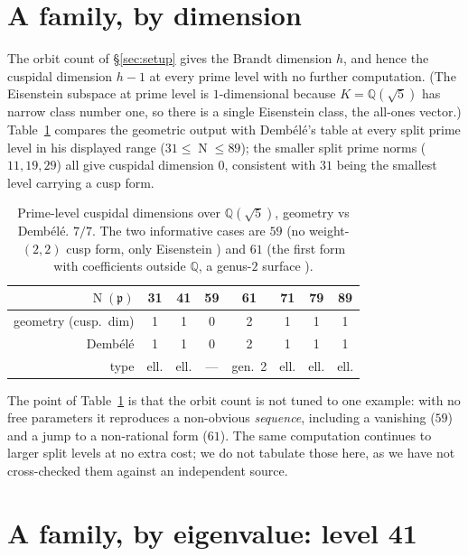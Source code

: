 \documentclass[11pt,a4paper]{article}
\newcommand{\Q}{\mathbb{Q}}
\newcommand{\fp}{\mathfrak{p}}
\DeclareMathOperator{\Nm}{N}
\begin{document}
\section{A family, by dimension}\label{sec:dims}

The orbit count of \S\ref{sec:setup} gives the Brandt dimension $h$, and
hence the cuspidal dimension $h-1$ at every prime level with no further
computation. (The Eisenstein subspace at prime level is $1$-dimensional
because $K=\Q(\sqrt5)$ has narrow class number one, so there is a single
Eisenstein class, the all-ones vector.) Table~\ref{tab:dims} compares
the geometric output with Demb\'el\'e's table \cite{Dembele2005} at
every split prime level in his displayed range ($31\le\Nm\le89$); the
smaller split prime norms ($11,19,29$) all give cuspidal dimension $0$,
consistent with $31$ being the smallest level carrying a cusp form.

\begin{table}[ht]
\centering
\begin{tabular}{r|ccccccc}
\toprule
$\Nm(\fp)$ & 31 & 41 & 59 & 61 & 71 & 79 & 89\\
\midrule
geometry (cusp.\ dim) & 1 & 1 & 0 & 2 & 1 & 1 & 1\\
Demb\'el\'e \cite{Dembele2005} & 1 & 1 & 0 & 2 & 1 & 1 & 1\\
type & ell. & ell. & --- & gen.~2 & ell. & ell. & ell.\\
\bottomrule
\end{tabular}
\caption{Prime-level cuspidal dimensions over $\Q(\sqrt5)$, geometry vs
Demb\'el\'e. $7/7$. The two informative cases are $59$ (no
weight-$(2,2)$ cusp form, only Eisenstein \cite[Ex.~3.6]{Dembele2005})
and $61$ (the first form with coefficients outside $\Q$, a genus-$2$
surface \cite[Rem.~4.4]{Dembele2005}).}
\label{tab:dims}
\end{table}

The point of Table~\ref{tab:dims} is that the orbit count is not tuned
to one example: with no free parameters it reproduces a non-obvious
\emph{sequence}, including a vanishing ($59$) and a jump to a
non-rational form ($61$). The same computation continues to larger
split levels at no extra cost; we do not tabulate those here, as we have
not cross-checked them against an independent source.

\section{A family, by eigenvalue: level 41}\label{sec:level41}
\end{document}
